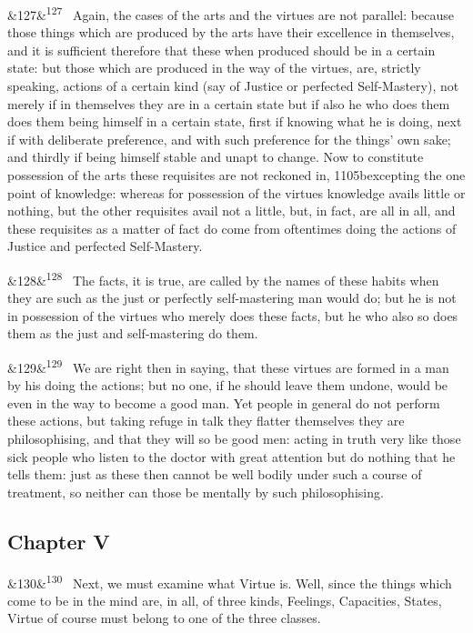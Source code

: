 \documentclass[12pt]{article}
\newcommand{\para}[1][]{\par\noindent\ifx&#1&\else\textsuperscript{\footnotesize #1}~\fi}
\begin{document}
\para[127] Again, the cases of the arts and the virtues are not parallel: because those things which are produced by the arts have their excellence in themselves, and it is sufficient therefore that these when produced should be in a certain state: but those which are produced in the way of the virtues, are, strictly speaking, actions of a certain kind (say of Justice or perfected Self-Mastery), not merely if in themselves they are in a certain state but if also he who does them does them being himself in a certain state, first if knowing what he is doing, next if with deliberate preference, and with such preference for the things' own sake; and thirdly if being himself stable and unapt to change. Now to constitute possession of the arts these requisites are not reckoned in, 1105bexcepting the one point of knowledge: whereas for possession of the virtues knowledge avails little or nothing, but the other requisites avail not a little, but, in fact, are all in all, and these requisites as a matter of fact do come from oftentimes doing the actions of Justice and perfected Self-Mastery.

\para[128] The facts, it is true, are called by the names of these habits when they are such as the just or perfectly self-mastering man would do; but he is not in possession of the virtues who merely does these facts, but he who also so does them as the just and self-mastering do them.

\para[129] We are right then in saying, that these virtues are formed in a man by his doing the actions; but no one, if he should leave them undone, would be even in the way to become a good man. Yet people in general do not perform these actions, but taking refuge in talk they flatter themselves they are philosophising, and that they will so be good men: acting in truth very like those sick people who listen to the doctor with great attention but do nothing that he tells them: just as these then cannot be well bodily under such a course of treatment, so neither can those be mentally by such philosophising.

\subsection*{Chapter V}

\para[130] Next, we must examine what Virtue is. Well, since the things which come to be in the mind are, in all, of three kinds, Feelings, Capacities, States, Virtue of course must belong to one of the three classes.
\end{document}
